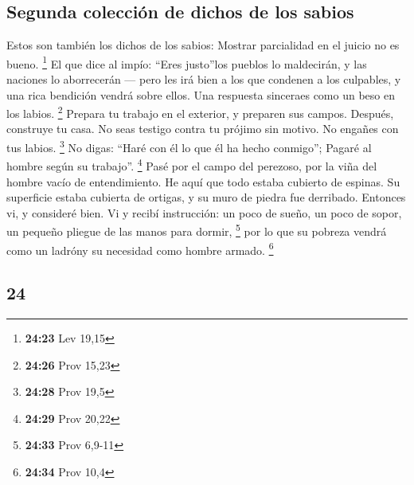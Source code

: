 \begin{paracol}{2}
\hypertarget{segunda-colecciuxf3n-de-dichos-de-los-sabios}{%
\subsection{Segunda colección de dichos de los
sabios}\label{segunda-colecciuxf3n-de-dichos-de-los-sabios}}

 Estos son también los dichos de los sabios: Mostrar
parcialidad en el juicio no es bueno. \footnote{\textbf{24:23} Lev 19,15}
 El que dice al impío: ``Eres justo''los pueblos lo
maldecirán, y las naciones lo aborrecerán ---  pero les
irá bien a los que condenen a los culpables, y una rica bendición vendrá
sobre ellos.  Una respuesta sinceraes como un beso en los
labios. \footnote{\textbf{24:26} Prov 15,23}  Prepara tu
trabajo en el exterior, y preparen sus campos. Después, construye tu
casa.  No seas testigo contra tu prójimo sin motivo. No
engañes con tus labios. \footnote{\textbf{24:28} Prov 19,5}
 No digas: ``Haré con él lo que él ha hecho conmigo'';
Pagaré al hombre según su trabajo''. \footnote{\textbf{24:29} Prov 20,22}
 Pasé por el campo del perezoso, por la viña del hombre
vacío de entendimiento.  He aquí que todo estaba cubierto
de espinas. Su superficie estaba cubierta de ortigas, y su muro de
piedra fue derribado.  Entonces vi, y consideré bien. Vi
y recibí instrucción:  un poco de sueño, un poco de
sopor, un pequeño pliegue de las manos para dormir, \footnote{\textbf{24:33}
  Prov 6,9-11}  por lo que su pobreza vendrá como un
ladróny su necesidad como hombre armado. \footnote{\textbf{24:34} Prov
  10,4}

\switchcolumn
\begin{otherlanguage}{english}

\hypertarget{section-47}{%
\section{24}\label{section-47}}


\end{otherlanguage}
\end{paracol}
